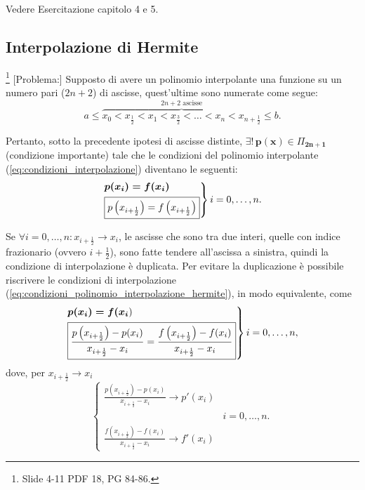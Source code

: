\begin{example}
	Vedere Esercitazione capitolo 4 e 5.
\end{example}

\subsection{Interpolazione di Hermite}\footnote{Slide 4-11 PDF 18, PG 84-86.}
[Problema:] Supposto di avere un polinomio interpolante una funzione su un numero pari ($2n+2$) di ascisse, quest'ultime sono numerate come segue:
\begin{equation}
    a\leq\overbrace{x_0 < x_{\frac{1}{2}} < x_1 < x_{\frac{3}{2}} < \hdots < x_n < x_{n+\frac{1}{2}}}^{2n+2\text{ ascisse}}\leq b.
\end{equation}

Pertanto, sotto la precedente ipotesi di ascisse distinte, $\boldsymbol{\exists!\, p(x)}\in\Pi_{\boldsymbol{2n+1}}$ (condizione importante) tale che le condizioni del polinomio interpolante (\ref{eq:condizioni_interpolazione}) diventano le seguenti:
\begin{equation}\label{eq:condizioni_polinomio_interpolazione_hermite}
    \begin{rcases}
        \boldsymbol{p(x_i)=f(x_i)}\\
        \boxed{p\left(x_{i+\frac{1}{2}}\right)=f\left(x_{i+\frac{1}{2}}\right)}
    \end{rcases} i=0,\hdots,n.
\end{equation}

Se $\forall i=0,\hdots,n: x_{i+\frac{1}{2}}\rightarrow x_i$, le ascisse che sono tra due interi, quelle con indice frazionario (ovvero $i+\frac{1}{2}$), sono fatte tendere all'ascissa a sinistra, quindi la condizione di interpolazione è duplicata. Per evitare la duplicazione è possibile riscrivere le condizioni di interpolazione (\ref{eq:condizioni_polinomio_interpolazione_hermite}), in modo equivalente, come
\begin{equation}\label{eq:hermCondPolInterpMod}
    \begin{rcases}
        \boldsymbol{p(x_i)=f(x_i})\\
        \boxed{\frac{p\left(x_{i+\frac{1}{2}}\right)-p(x_i)}{x_{i+\frac{1}{2}}-x_i}=\frac{f\left(x_{i+\frac{1}{2}}\right)-f(x_i)}{x_{i+\frac{1}{2}}-x_i}}
     \end{rcases} i=0,\hdots,n,
\end{equation}
dove, per $x_{i+\frac{1}{2}}\rightarrow x_i$
\begin{equation*}
    \begin{cases}
        \frac{p\left(x_{i+\frac{1}{2}}\right)-p(x_i)}{x_{i+\frac{1}{2}}-x_i}\rightarrow p'(x_i)\\
        & i=0,\hdots, n.\\
        \frac{f\left(x_{i+\frac{1}{2}}\right)-f(x_i)}{x_{i+\frac{1}{2}}-x_i}\rightarrow f'(x_i)
    \end{cases}
\end{equation*}


